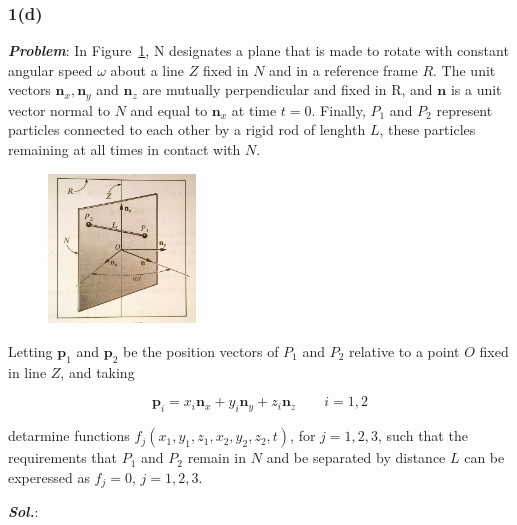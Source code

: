 \subsubsection{1(d)}
\textbf{\textit{Problem}}: In Figure~\ref{1_d}, N designates a plane that is made to rotate with constant angular speed $\omega$ about a line $Z$ fixed in $N$ and in a reference frame $R$. The unit vectors $\pmb n_x, \pmb n_y$ and  $\pmb n_z$ are mutually perpendicular and fixed in R, and $\pmb n$ is a unit vector normal to $N$ and equal to $\pmb n_x$ at time $t=0$. Finally, $P_1$ and $P_2$ represent particles connected to each other by a rigid rod of lenghth $L$, these particles remaining at all times in contact with $N$.

\begin{figure}[H]
    \centering
    \includegraphics[width = 0.35\textwidth, height = 0.3\textwidth]{figs/ProbSet_1/1_d.jpg}
    \caption{}
    \label{1_d}
\end{figure}


Letting $\pmb p_1$ and $\pmb p_2$ be the position vectors of $P_1$ and $P_2$ relative to a point $O$ fixed in line $Z$, and taking

$$\pmb p_i = x_i \pmb n_x + y_i \pmb n_y + z_i \pmb n_z \qquad i = 1, 2$$

detarmine functions $f_j(x_1, y_1, z_1, x_2, y_2, z_2, t)$, for $j=1, 2, 3$, such that the requirements that $P_1$ and $P_2$ remain in $N$ and be separated by distance $L$ can be experessed as $f_j = 0$, $j = 1, 2, 3$.

\textbf{\textit{Sol.}}:


